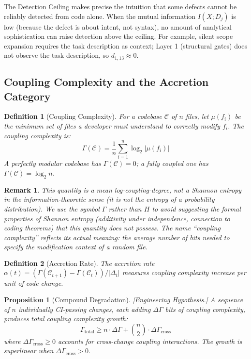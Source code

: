 \documentclass[11pt, a4paper]{googledeepmind}
\newtheorem{definition}{Definition}[section]
\newtheorem{proposition}{Proposition}[section]
\newtheorem*{remark}{Remark}
\begin{document}
The Detection Ceiling makes precise the intuition that some defects cannot be reliably detected from code alone. When the mutual information $I(X; D_j)$ is low (because the defect is about intent, not syntax), no amount of analytical sophistication can raise detection above the ceiling. For example, silent scope expansion requires the task description as context; Layer 1 (structural gates) does not observe the task description, so $d_{1,13} \approx 0$.

\subsection{Coupling Complexity and the Accretion Category}

\begin{definition}[Coupling Complexity]
\label{def:codebase-entropy}
For a codebase $\mathcal{C}$ of $n$ files, let $\mu(f_i)$ be the minimum set of files a developer must understand to correctly modify $f_i$. The \emph{coupling complexity} is:
\begin{equation}
\Gamma(\mathcal{C}) = \frac{1}{n} \sum_{i=1}^{n} \log_2 |\mu(f_i)|
\end{equation}
A perfectly modular codebase has $\Gamma(\mathcal{C}) = 0$; a fully coupled one has $\Gamma(\mathcal{C}) = \log_2 n$.
\end{definition}

\begin{remark}
This quantity is a mean log-coupling-degree, not a Shannon entropy in the information-theoretic sense (it is not the entropy of a probability distribution). We use the symbol $\Gamma$ rather than $H$ to avoid suggesting the formal properties of Shannon entropy (additivity under independence, connection to coding theorems) that this quantity does not possess. The name ``coupling complexity'' reflects its actual meaning: the average number of bits needed to specify the modification context of a random file.
\end{remark}

\begin{definition}[Accretion Rate]
The accretion rate $\alpha(t) = (\Gamma(\mathcal{C}_{t+1}) - \Gamma(\mathcal{C}_t)) / |\Delta_t|$ measures coupling complexity increase per unit of code change.
\end{definition}

\begin{proposition}[Compound Degradation]
\label{thm:compound-degradation}
\emph{[Engineering Hypothesis.]} A sequence of $n$ individually CI-passing changes, each adding $\Delta \Gamma$ bits of coupling complexity, produces total coupling complexity growth:
\begin{equation}
    \Gamma_{\text{total}} \geq n \cdot \Delta \Gamma + \binom{n}{2} \cdot \Delta \Gamma_{\text{cross}}
\end{equation}
where $\Delta \Gamma_{\text{cross}} \geq 0$ accounts for cross-change coupling interactions. The growth is superlinear when $\Delta \Gamma_{\text{cross}} > 0$.
\end{proposition}
\end{document}

